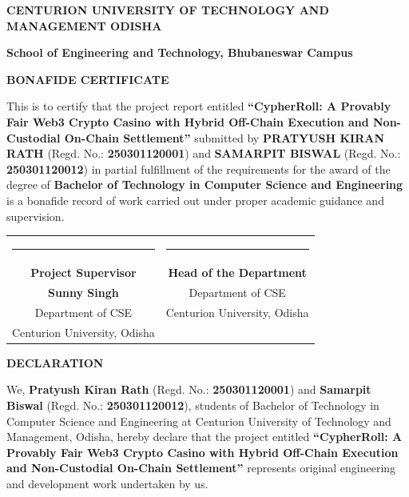 \newpage
{}
\setcounter{page}{2}
\pagestyle{frontmatterstyle}
\thispagestyle{frontmatterstyle}
\begin{center}
    {\large \textbf{CENTURION UNIVERSITY OF TECHNOLOGY AND MANAGEMENT ODISHA}\par}
    \vspace{0.15cm}
    {\normalsize \textbf{School of Engineering and Technology, Bhubaneswar Campus}\par}
    \vspace{0.8cm}
    {\Large \textbf{BONAFIDE CERTIFICATE}\par}
    \vspace{0.8cm}
\end{center}

This is to certify that the project report entitled \textbf{``CypherRoll: A Provably Fair Web3 Crypto Casino with Hybrid Off-Chain Execution and Non-Custodial On-Chain Settlement''} submitted by \textbf{PRATYUSH KIRAN RATH} (Regd. No.: \textbf{250301120001}) and \textbf{SAMARPIT BISWAL} (Regd. No.: \textbf{250301120012}) in partial fulfillment of the requirements for the award of the degree of \textbf{Bachelor of Technology in Computer Science and Engineering} is a bonafide record of work carried out under proper academic guidance and supervision.

\vspace{3.5cm}

\noindent
\begin{tabular*}{\textwidth}{@{\extracolsep{\fill}}cc}
    \rule{5.5cm}{0.4pt} & \rule{5.5cm}{0.4pt} \\
    \textbf{Project Supervisor} & \textbf{Head of the Department} \\
    \textbf{Sunny Singh} & Department of CSE \\
    Department of CSE & Centurion University, Odisha \\
    Centurion University, Odisha & 
\end{tabular*}

\newpage
\pagestyle{frontmatterstyle}
\thispagestyle{frontmatterstyle}
\begin{center}
    \vspace*{0.5cm}
    {\Large \textbf{DECLARATION}\par}
    \vspace{1.0cm}
\end{center}

We, \textbf{Pratyush Kiran Rath} (Regd. No.: \textbf{250301120001}) and \textbf{Samarpit Biswal} (Regd. No.: \textbf{250301120012}), students of Bachelor of Technology in Computer Science and Engineering at Centurion University of Technology and Management, Odisha, hereby declare that the project entitled \textbf{``CypherRoll: A Provably Fair Web3 Crypto Casino with Hybrid Off-Chain Execution and Non-Custodial On-Chain Settlement''} represents original engineering and development work undertaken by us.

